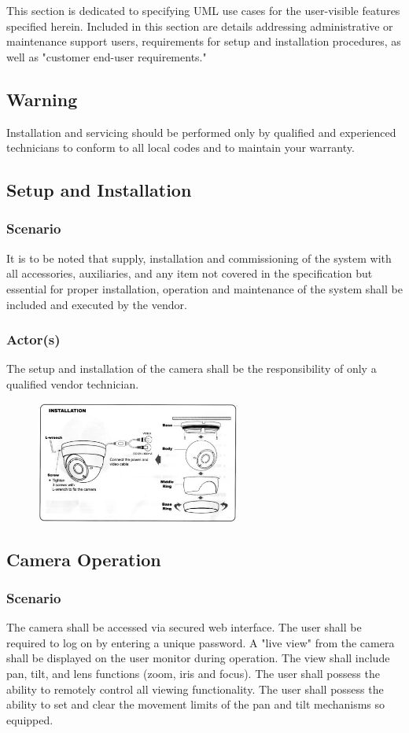 This section is dedicated to specifying UML use cases for the user-visible features specified herein. Included in this section are details addressing administrative or maintenance support users, requirements for setup and installation procedures, as well as "customer end-user requirements."
\subsection{Warning}
Installation and servicing should be performed only by qualified and experienced technicians to conform to all local codes and to maintain your warranty.
\subsection{Setup and Installation}
\subsubsection{Scenario}
It is to be noted that supply, installation and commissioning of the system with all accessories, auxiliaries, and any item not covered in the specification but essential for proper installation, operation and maintenance of the system shall be included and executed by the vendor.
\subsubsection{Actor(s)}
The setup and installation of the camera shall be the responsibility of only a qualified vendor technician.
\vspace{0.5 in}
\begin{figure}[h!]
	\centering
   	\includegraphics[width=0.60\textwidth]{images/Installation-Diagram}
\end{figure}
\vspace{0.5 in}
\subsection{Camera Operation}
\subsubsection{Scenario}
The camera shall be accessed via secured web interface.
The user shall be required to log on by entering a unique password.
A "live view" from the camera shall be displayed on the user monitor during operation. 
The view shall include pan, tilt, and lens functions (zoom, iris and focus). 
The user shall possess the ability to remotely control all viewing functionality.
The user shall possess the ability to set and clear the movement limits of the pan and tilt mechanisms so equipped.
